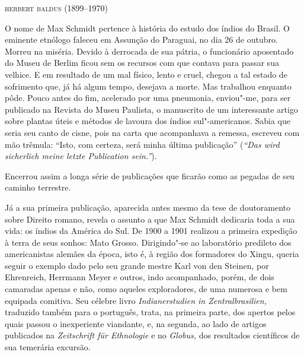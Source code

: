 \begin{flushright}
\textsc{herbert baldus (1899--1970)}\medskip
\end{flushright}

O nome de Max Schmidt pertence à história do estudo dos índios do
Brasil. O eminente etnólogo faleceu em Assunção do Paraguai, no dia 26
de outubro. Morreu na miséria. Devido à derrocada de sua pátria, o
funcionário aposentado do Museu de Berlim ficou sem os recursos com que
contava para passar sua velhice. E em resultado de um mal físico, lento
e cruel, chegou a tal estado de sofrimento que, já há algum tempo,
desejava a morte. Mas trabalhou enquanto pôde. Pouco antes do fim,
acelerado por uma pneumonia, enviou"-me, para ser publicado na Revista
do Museu Paulista, o manuscrito de um interessante artigo sobre plantas
úteis e métodos de lavoura dos índios sul"-americanos. Sabia que seria
seu canto de cisne, pois na carta que acompanhava a remessa, escreveu
com mão trêmula: ``Isto, com certeza, será minha última publicação''
(\emph{``Das wird sicherlich meine letzte Publication sein.''}).

Encerrou assim a longa série de publicações que ficarão como as pegadas
de seu caminho terrestre.


Já a sua primeira publicação, aparecida antes mesmo da tese de
doutoramento sobre Direito romano, revela o assunto a que Max Schmidt
dedicaria toda a sua vida: os índios da América do Sul. De 1900 a 1901
realizou a primeira expedição à terra de seus sonhos: Mato Grosso.
Dirigindo"-se ao laboratório predileto dos americanistas alemães da
época, isto é, à região dos formadores do Xingu, queria seguir o exemplo
dado pelo seu grande mestre Karl von den Steinen, por Ehrenreich,
Herrmann Meyer e outros, indo acompanhado, porém, de dois camaradas
apenas e não, como aqueles exploradores, de uma numerosa e bem equipada
comitiva. Seu célebre livro \emph{Indianerstudien in Zentralbrasilien,}
traduzido também para o português, trata, na primeira parte, dos apertos
pelos quais passou o inexperiente viandante, e, na segunda, ao lado de
artigos publicados na \emph{Zeitschrift für Ethnologie} e no
\emph{Globus,} dos resultados científicos de sua temerária excursão.

